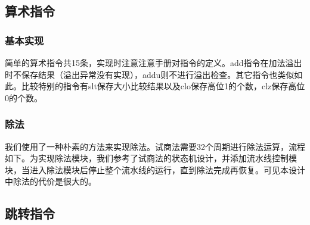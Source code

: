 \subsection{算术指令}
\subsubsection{基本实现}
    简单的算术指令共15条，实现时注意注意手册对指令的定义。add指令在加法溢出时不保存结果（溢出异常没有实现），addu则不进行溢出检查。其它指令也类似如此。比较特别的指令有slt保存大小比较结果以及clo保存高位1的个数，clz保存高位0的个数。
\subsubsection{除法}
    我们使用了一种朴素的方法来实现除法。试商法需要32个周期进行除法运算，流程如下。为实现除法模块，我们参考了试商法的状态机设计，并添加流水线控制模块，当进入除法模块后停止整个流水线的运行，直到除法完成再恢复。可见本设计中除法的代价是很大的。

\subsection{跳转指令}
